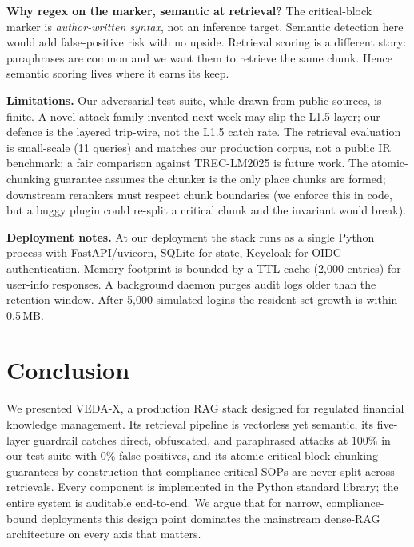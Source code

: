 \documentclass[conference]{IEEEtran}
\begin{document}
\textbf{Why regex on the marker, semantic at retrieval?}  The
critical-block marker is \emph{author-written syntax}, not an
inference target.  Semantic detection here would add false-positive
risk with no upside.  Retrieval scoring is a different story:
paraphrases are common and we want them to retrieve the same chunk.
Hence semantic scoring lives where it earns its keep.

\textbf{Limitations.}  Our adversarial test suite, while drawn
from public sources, is finite.  A novel attack family invented
next week may slip the L1.5 layer; our defence is the layered
trip-wire, not the L1.5 catch rate.  The retrieval evaluation is
small-scale (11 queries) and matches our production corpus, not a
public IR benchmark; a fair comparison against TREC-LM2025 is
future work.  The atomic-chunking guarantee assumes the chunker
is the only place chunks are formed; downstream rerankers must
respect chunk boundaries (we enforce this in code, but a buggy
plugin could re-split a critical chunk and the invariant would
break).

\textbf{Deployment notes.}  At our deployment the stack runs as a
single Python process with FastAPI/uvicorn, SQLite for state,
Keycloak for OIDC authentication.  Memory footprint is bounded by
a TTL cache (2{,}000 entries) for user-info responses.  A
background daemon purges audit logs older than the retention
window.  After 5{,}000 simulated logins the resident-set growth is
within 0.5\,MB.

\section{Conclusion}
\label{sec:conclusion}

We presented \textsc{VEDA-X}, a production RAG stack designed for
regulated financial knowledge management.  Its retrieval pipeline
is vectorless yet semantic, its five-layer guardrail catches
direct, obfuscated, and paraphrased attacks at $100\%$ in our
test suite with $0\%$ false positives, and its atomic critical-block
chunking guarantees by construction that compliance-critical SOPs
are never split across retrievals.  Every component is
implemented in the Python standard library; the entire system is
auditable end-to-end.  We argue that for narrow,
compliance-bound deployments this design point dominates the
mainstream dense-RAG architecture on every axis that matters.

\end{document}
